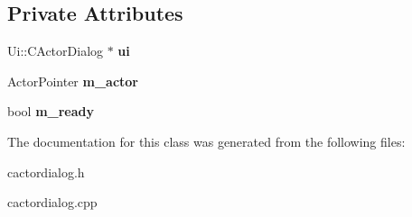 \subsection*{Private Attributes}
\begin{DoxyCompactItemize}
\item 
\mbox{\label{class_c_actor_dialog_aa8838b1d6d9d958d43e94f2f03db5f4d}} 
Ui\+::\+C\+Actor\+Dialog $\ast$ {\bfseries ui}
\item 
\mbox{\label{class_c_actor_dialog_a59aeb70af16fb49fcdaf42cacf5870cb}} 
Actor\+Pointer {\bfseries m\+\_\+actor}
\item 
\mbox{\label{class_c_actor_dialog_aaf348679555d0d44a65ffe623bdffa7b}} 
bool {\bfseries m\+\_\+ready}
\end{DoxyCompactItemize}


The documentation for this class was generated from the following files\+:\begin{DoxyCompactItemize}
\item 
cactordialog.\+h\item 
cactordialog.\+cpp\end{DoxyCompactItemize}
